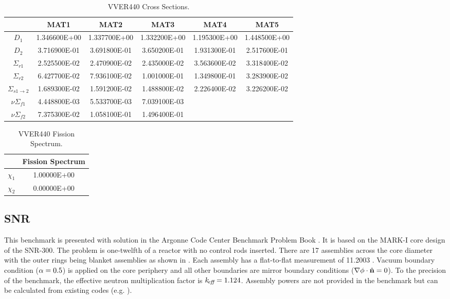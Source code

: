     \begin{table}
      \caption{VVER440 Cross Sections.}
      \label{tab:vver440xs}
      \begin{center}
        \begin{tabular}{cccccc}
          \toprule
          &MAT1&MAT2&MAT3&MAT4&MAT5\\
          \midrule
          $D_1$&1.346600E+00&1.337700E+00&1.332200E+00&1.195300E+00&1.448500E+00\\
          $D_2$&3.716900E-01&3.691800E-01&3.650200E-01&1.931300E-01&2.517600E-01\\
          $\Sigma_{r1}$&2.525500E-02&2.470900E-02&2.435000E-02&3.563600E-02&3.318400E-02\\
          $\Sigma_{r2}$&6.427700E-02&7.936100E-02&1.001000E-01&1.349800E-01&3.283900E-02\\
          $\Sigma_{s 1\rightarrow 2}$&1.689300E-02&1.591200E-02&1.488800E-02&2.226400E-02&3.226200E-02\\
          $ \nu \Sigma_{f1}$&4.448800E-03&5.533700E-03&7.039100E-03&&\\
          $ \nu \Sigma_{f2}$&7.375300E-02&1.058100E-01&1.496400E-01&&\\
          \bottomrule
        \end{tabular}
      \end{center}
    \end{table}

    \begin{table}
      \caption{VVER440 Fission Spectrum.}
      \label{tab:vver440chi}
      \begin{center}
        \begin{tabular}{cc}
          \toprule
          &Fission Spectrum \\
          \midrule
          $\chi_1$ & 1.00000E+00  \\
          $\chi_2$ & 0.00000E+00  \\
          \bottomrule
        \end{tabular}
      \end{center}
    \end{table}

  \subsection{SNR}
    \label{sec:snr}
    This benchmark is presented with solution in the Argonne Code Center
    Benchmark Problem Book \cite{argonneBenchmark}. It
    is based on the MARK-I core design of the SNR-300. The problem is
    one-twelfth of a reactor with no control rods inserted. There are 17
    assemblies across the core diameter with the outer rings being blanket
    assemblies as shown in . Each assembly has a flat-to-flat
    measurement of 11.2003 . Vacuum boundary condition ($\alpha =
    0.5$) is applied on the core periphery and all other boundaries are mirror
    boundary conditions ($\mathbf{\nabla} \phi \cdot \hat{\mathbf{n}} = 0$). To the precision of the 
    benchmark, the effective neutron multiplication factor is $k_{\!\mbox{\scriptsize \em eff}} = 1.124$. 
    Assembly powers are not provided in the benchmark but can be calculated from 
    existing codes (e.g. \dif).

